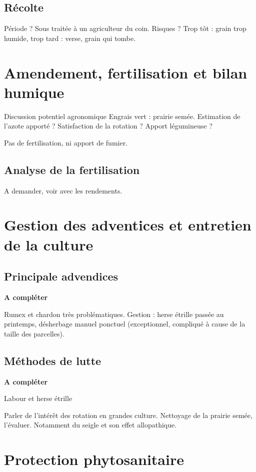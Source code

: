\documentclass{article}
\begin{document}
\subsection{Récolte}

Période ? Sous traitée à un agriculteur du coin. 
Risques ? Trop tôt : grain trop humide, trop tard : verse, grain qui tombe. 

\section{Amendement, fertilisation et bilan humique}

Discussion potentiel agronomique Engrais vert : prairie semée. Estimation de l'azote apporté ? Satisfaction de la rotation ? Apport légumineuse ?

Pas de fertilisation, ni apport de fumier.

\subsection{Analyse de la fertilisation}

A demander, voir avec les rendements. 

\section{Gestion des adventices et entretien de la culture}

\subsection{Principale advendices}

\textbf{A compléter}

Rumex et chardon très problématiques. Gestion : herse étrille passée au printemps, désherbage manuel ponctuel (exceptionnel, compliqué à cause de la taille des parcelles).

\subsection{Méthodes de lutte}

\textbf{A compléter}

Labour et herse étrille

Parler de l'intérêt des rotation en grandes culture. Nettoyage de la prairie semée, l'évaluer. Notamment du seigle et son effet allopathique.

\section{Protection phytosanitaire}
\end{document}

